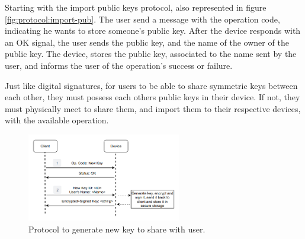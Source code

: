 Starting with the import public keys protocol, also represented in figure \ref{fig:protocol:import-pub}.
The user send a message with the operation code, indicating he wants to store someone's public key.
After the device responds with an OK signal, the user sends the public key, and the name of the owner of the public key.
The device, stores the public key, associated to the name sent by the user, and informs the user of the operation's success or failure.

Just like digital signatures, for users to be able to share symmetric keys between each other, they must possess each others public keys in their device. If not, they must physically meet to share them, and import them to their respective devices, with the available operation.

\begin{figure}[h]
	\centering
	\includegraphics[width=0.6\textwidth]{./Images/new-key.png}
	\caption{Protocol to generate new key to share with user.}
	\label{fig:protocol:new-key}
\end{figure}

